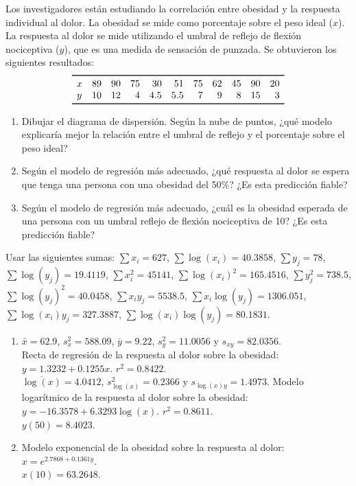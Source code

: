 {Los investigadores están estudiando la correlación entre obesidad y la respuesta individual al dolor. 
La obesidad se mide como porcentaje sobre el peso ideal ($x$).
 La respuesta al dolor se mide utilizando el umbral de reflejo de flexión nociceptiva ($y$), que es una medida de sensación de punzada. Se obtuvieron los siguientes resultados:
\[
\begin{array}{lrrrrrrrrrr}
\toprule
x & 89 & 90 & 75 & 30 & 51 & 75 & 62 & 45 & 90 & 20\\
y & 10 & 12 & 4 & 4.5 & 5.5 & 7 & 9 & 8 & 15 & 3\\
\bottomrule
\end{array}
\]
\begin{enumerate}
\item Dibujar el diagrama de dispersión. Según la nube de puntos, ¿qué modelo explicaría mejor la relación entre el umbral de reflejo y el porcentaje sobre el peso ideal?
\item Según el modelo de regresión más adecuado, ¿qué respuesta al dolor se espera que tenga una persona con una obesidad del 50\%? ¿Es esta predicción fiable?
\item Según el modelo de regresión más adecuado, ¿cuál es la obesidad esperada de una persona con un umbral reflejo de flexión nociceptiva de 10? ¿Es esta predicción fiable?
\end{enumerate}

Usar las siguientes sumas: $\sum x_i=627$, $\sum \log(x_i)=40.3858$, $\sum y_j=78$,
$\sum \log(y_j)=19.4119$, $\sum x_i^2=45141$, $\sum \log(x_i)^2=165.4516$, $\sum y_j^2=738.5$, $\sum
\log(y_j)^2=40.0458$, $\sum x_iy_j=5538.5$, $\sum x_i\log(y_j)=1306.051$, $\sum \log(x_i)y_j=327.3887$, $\sum
\log(x_i)\log(y_j)=80.1831$.
}
{
\begin{enumerate}[start=2]
\item $\bar{x}=62.9$, $s_x^2=588.09$, $\bar{y}=9.22$, $s_y^2=11.0056$ y $s_{xy}=82.0356$.\\
Recta de regresión de la respuesta al dolor sobre la obesidad: $y=1.3232+0.1255x$. $r^2=0.8422$.\\
$\overline{\log⁡(x)}=4.0412$, $s_{\log⁡(x)}^2=0.2366$ y $s_{\log⁡(x)y}=1.4973$.
Modelo logarítmico de la respuesta al dolor sobre la obesidad: $y=−16.3578+6.3293\log⁡(x)$.
$r^2=0.8611$.\\
$y(50)=8.4023$.
\item Modelo exponencial de la obesidad sobre la respuesta al dolor: $x=e^{2.7868+0.1361y}$.\\
$x(10)=63.2648$.
\end{enumerate}
}
{
}


